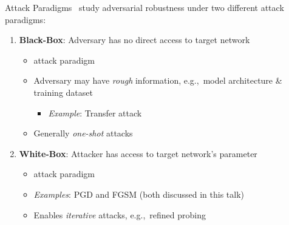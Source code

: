 \begin{frame}{Attack Paradigms}
  \madry\ study adversarial robustness under two different attack paradigms:
  \vfill
  \begin{enumerate}[<+->]
    \item \textbf{Black-Box}: Adversary has no direct access to target network
      \begin{itemize}[<+->]
        \setlength\itemsep{6pt}
        \item {} attack paradigm
        \item Adversary may have \textit{rough} information, e.g.,~model architecture \& training dataset
          \begin{itemize}
            \item \textit{Example}: Transfer attack
          \end{itemize}
        \item Generally \textit{one-shot} attacks
      \end{itemize}
    \vfill
    \item \textbf{White-Box}: Attacker has access to target network's parameter
      \begin{itemize}
        \setlength\itemsep{6pt}
        \item {} attack paradigm
        \item \textit{Examples}: PGD and FGSM (both discussed in this talk)
        \item Enables \textit{iterative} attacks, e.g.,~refined probing
      \end{itemize}
  \end{enumerate}
\end{frame}


